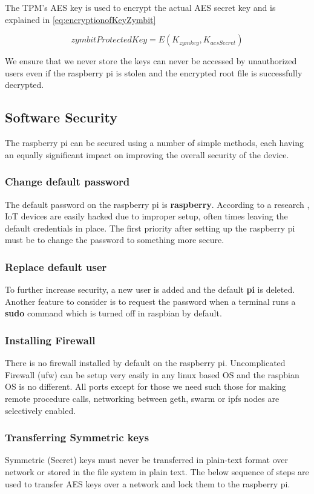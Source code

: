 \documentclass[11pt,openright]{report}
\begin{document}
The TPM's AES key is used to encrypt the actual AES secret key and is explained in \ref{eq:encryptionofKeyZymbit}

\begin{equation} \label{eq:encryptionofKeyZymbit}
    zymbitProtectedKey =  E(K_{zymkey}, K_{aesSecret})
\end{equation}

We ensure that we never store the keys can never be accessed by unauthorized users even if the raspberry pi is stolen and the encrypted root file is successfully decrypted.

\subsection{Software Security}
The raspberry pi can be secured using a number of simple methods, each having an equally significant impact on improving the overall security of the device.

\subsubsection{Change default password}
The default password on the raspberry pi is \textbf{raspberry}. According to a research \cite{8364059}, IoT devices are easily hacked due to improper setup, often times leaving the default credentials in place. The first priority after setting up the raspberry pi must be to change the password to something more secure.

\subsubsection{Replace default user}
To further increase security, a new user is added and the default \textbf{pi} is deleted. Another feature to consider is to request the password when a terminal runs a \textbf{sudo} command which is turned off in raspbian by default.

\subsubsection{Installing Firewall}
There is no firewall installed by default on the raspberry pi. Uncomplicated Firewall (ufw) can be setup very easily in any linux based OS and the raspbian OS is no different. All ports except for those we need such those for making remote procedure calls, networking between geth, swarm or ipfs nodes are selectively enabled.

\subsubsection{Transferring Symmetric keys} \label{transfer_symm_keys}
Symmetric (Secret) keys must never be transferred in plain-text format over network or stored in the file system in plain text. The below sequence of steps are used to transfer AES keys over a network and lock them to the raspberry pi.
\end{document}
